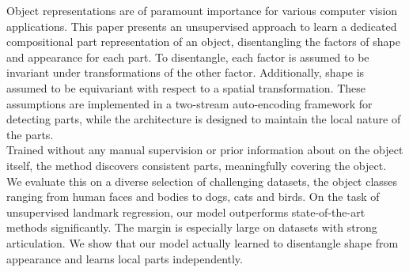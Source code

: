   Object representations are of paramount importance for various computer vision applications. %
  This paper presents an unsupervised approach to learn a dedicated compositional part representation of an object, disentangling the factors of shape and appearance for each part. %
  To disentangle, each factor is assumed to be invariant under transformations of the other factor. Additionally, shape is assumed to be equivariant with respect to a spatial transformation. These assumptions are implemented in a two-stream auto-encoding framework for detecting parts, while the architecture is designed to maintain the local nature of the parts.\\
  Trained without any manual supervision or prior information about on the object itself, the method discovers consistent parts, meaningfully covering the object. We evaluate this on a diverse selection of challenging datasets, the object classes ranging from human faces and bodies to dogs, cats and birds.
  On the task of unsupervised landmark regression, our model outperforms state-of-the-art methods significantly. The margin is especially large on datasets with strong articulation.
  We show that our model actually learned to disentangle shape from appearance and learns local parts independently.
